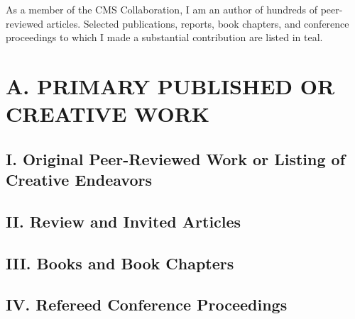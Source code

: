 \documentclass{res}
\newcommand{\MarginText}[1]{\section{#1}\vspace{10pt}}
\begin{document}

\address{}
\address{}

\newcommand{\DOI}[1]{\href{https://doi.org/#1}{doi:#1}}
\begin{resume}


  As a member of the CMS Collaboration, I am an author of hundreds of peer-reviewed articles.
  Selected publications, reports, book chapters, and conference proceedings to which I made a substantial contribution are listed in {\color{TealBlue}teal}.

  \MarginText{A. PRIMARY PUBLISHED OR CREATIVE WORK}
  \subsection{I. Original Peer-Reviewed Work or Listing of Creative Endeavors}
  \nocite{*}
  \vspace{10pt}
  \printbibliography[heading=none]

  \subsection{II. Review and Invited Articles}
  \nocite{*}
  \vspace{10pt}
  \printbibliography[heading=none]

  \subsection{III. Books and Book Chapters}
  \nocite{*}
  \vspace{10pt}
  \printbibliography[heading=none]

  \subsection{IV. Refereed Conference Proceedings}
  \nocite{*}
  \vspace{10pt}
  \printbibliography[heading=none]


\end{resume}
\end{document}
